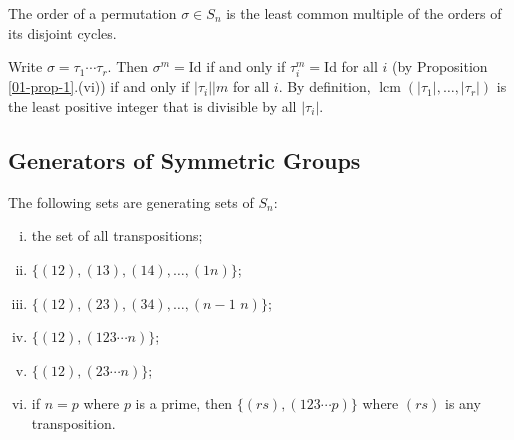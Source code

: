 \begin{corollary}
	The order of a permutation $\sigma\in S_n$ is the least common multiple of the orders of its disjoint cycles.
\end{corollary}
\begin{sketch}Write $\sigma = \tau_1\cdots \tau_r$. Then
	$\sigma^m = \text{Id}$ if and only if $\tau_i^m = \text{Id}$ for all $i$ (by Proposition \ref{01-prop-1}.(vi)) if and only if $|\tau_i|\big|m$ for all $i$. By definition, $\operatorname{lcm}(|\tau_1|,\dots,|\tau_r|)$ is the least positive integer that is divisible by all $|\tau_i|$.  
\end{sketch}

\subsection{Generators of Symmetric Groups}
\begin{proposition}
The following sets are generating sets of $S_n$:
	\begin{enumerate}[(i)] 
		\item the set of all transpositions;
		\item $\{(12),(13),(14),\dots,(1n)\}$;
		\item $\{(12),(23),(34),\dots, (n-1\,\, n)\}$;
		\item $\{(12),(123\cdots n)\}$;
		\item $\{(12),(23\cdots n)\}$;
		\item  if $n=p$ where $p$ is a prime, then $\{(rs),(123\cdots p)\}$ where $(rs)$ is any transposition.
	\end{enumerate}
\end{proposition}
